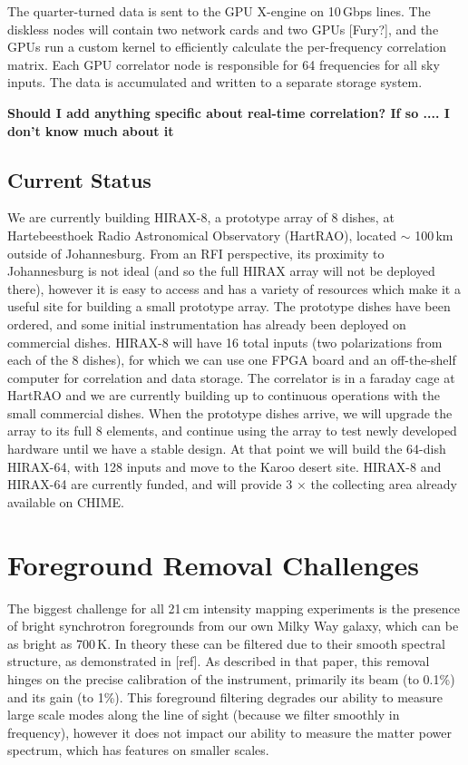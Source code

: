 \documentclass[]{spie}  %
\begin{document}
The quarter-turned data is sent to the GPU X-engine on 10\,Gbps lines. The diskless nodes will contain two network cards and two GPUs [Fury?], and the GPUs run a custom kernel to efficiently calculate the per-frequency correlation matrix. Each GPU correlator node is responsible for 64 frequencies for all sky inputs. The data is accumulated and written to a separate storage system. \newline

\textbf{Should I add anything specific about real-time correlation? If so .... I don't know much about it}

\subsection{Current Status}

We are currently building HIRAX-8, a prototype array of 8 dishes, at Hartebeesthoek Radio Astronomical Observatory (HartRAO), located $\sim$ 100\,km outside of Johannesburg. From an RFI perspective, its proximity to Johannesburg is not ideal (and so the full HIRAX array will not be deployed there), however it is easy to access and has a variety of resources which make it a useful site for building a small prototype array. The prototype dishes have been ordered, and some initial instrumentation has already been deployed on commercial dishes. HIRAX-8 will have 16 total inputs (two polarizations from each of the 8 dishes), for which we can use one FPGA board and an off-the-shelf computer for correlation and data storage. The correlator is in a faraday cage at HartRAO and we are currently building up to continuous operations with the small commercial dishes. When the prototype dishes arrive, we will upgrade the array to its full 8 elements, and continue using the array to test newly developed hardware until we have a stable design. At that point we will build the 64-dish HIRAX-64, with 128 inputs and move to the Karoo desert site. HIRAX-8 and HIRAX-64 are currently funded, and will provide 3 $\times$ the collecting area already available on CHIME.


\section{Foreground Removal Challenges}
\label{sec:chall}

The biggest challenge for all 21\,cm intensity mapping experiments is the presence of bright synchrotron foregrounds from our own Milky Way galaxy, which can be as bright as 700\,K. In theory these can be filtered due to their smooth spectral structure, as demonstrated in [ref]. As described in that paper, this removal hinges on the precise calibration of the instrument, primarily its beam (to 0.1\%) and its gain (to 1\%). This foreground filtering degrades our ability to measure large scale modes along the line of sight (because we filter smoothly in frequency), however it does not impact our ability to measure the matter power spectrum, which has features on smaller scales. \newline
\end{document}
